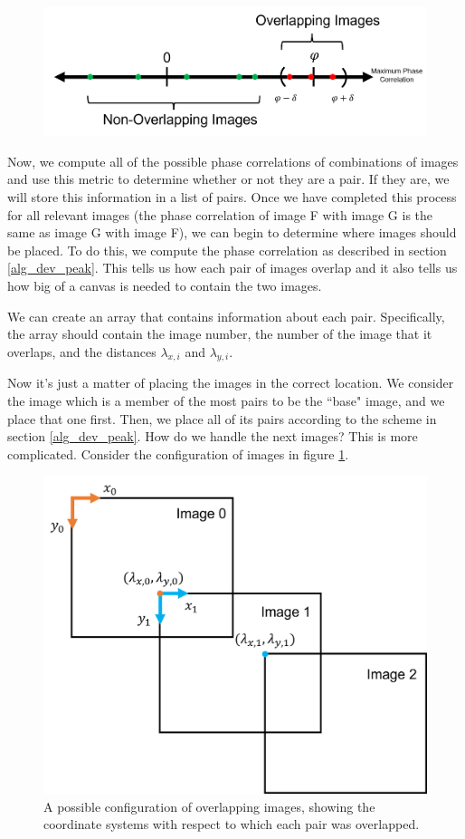 \documentclass[]{article}
\begin{document}
\begin{figure}[H]
	\centering
	\includegraphics[width=6in]{overlap.png}
\end{figure}

Now, we compute all of the possible phase correlations of combinations of images and use this metric to determine whether or not they are a pair. If they are, we will store this information in a list of pairs. Once we have completed this process for all relevant images (the phase correlation of image F with image G is the same as image G with image F), we can begin to determine where images should be placed. To do this, we compute the phase correlation as described in section \ref{alg_dev_peak}. This tells us how each pair of images overlap and it also tells us how big of a canvas is needed to contain the two images. 

We can create an array that contains information about each pair. Specifically, the array should contain the image number, the number of the image that it overlaps, and the distances $\lambda_{x,i}$ and $\lambda_{y,i}$.

Now it's just a matter of placing the images in the correct location. We consider the image which is a member of the most pairs to be the ``base" image, and we place that one first. Then, we place all of its pairs according to the scheme in section \ref{alg_dev_peak}. How do we handle the next images? This is more complicated. Consider the configuration of images in figure \ref{coord_sys}.

\begin{figure}[H]
	\centering
	\label{coord_sys}
	\includegraphics[width=5in]{coord_sys.png}
	\caption{A possible configuration of overlapping images, showing the coordinate systems with respect to which each pair was overlapped.}
\end{figure}
\end{document}
